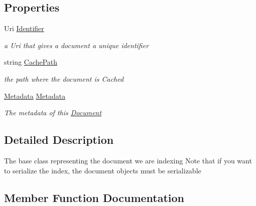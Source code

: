 \subsection*{Properties}
\begin{DoxyCompactItemize}
\item 
Uri \hyperlink{classdot_net_i_r_1_1_base_indexing_1_1_document_a431f21775d46575b1fe5b8ae0305eba0}{Identifier}
\begin{DoxyCompactList}\small\item\em a Uri that gives a document a unique identifier \end{DoxyCompactList}\item 
string \hyperlink{classdot_net_i_r_1_1_base_indexing_1_1_document_a80e92b6ffc89897c1dd53cb491eaf30b}{Cache\+Path}
\begin{DoxyCompactList}\small\item\em the path where the document is Cached \end{DoxyCompactList}\item 
\hyperlink{classdot_net_i_r_1_1_base_indexing_1_1_metadata}{Metadata} \hyperlink{classdot_net_i_r_1_1_base_indexing_1_1_document_a4de0f26b50e8fcb9a37519ba300a3586}{Metadata}
\begin{DoxyCompactList}\small\item\em The metadata of this \hyperlink{classdot_net_i_r_1_1_base_indexing_1_1_document}{Document} \end{DoxyCompactList}\end{DoxyCompactItemize}


\subsection{Detailed Description}
The base class representing the document we are indexing Note that if you want to serialize the index, the document objects must be serializable 



\subsection{Member Function Documentation}
\hypertarget{classdot_net_i_r_1_1_base_indexing_1_1_document_a30bfe8ab80ad0c37350719da8e571de5}{}\label{classdot_net_i_r_1_1_base_indexing_1_1_document_a30bfe8ab80ad0c37350719da8e571de5} 
